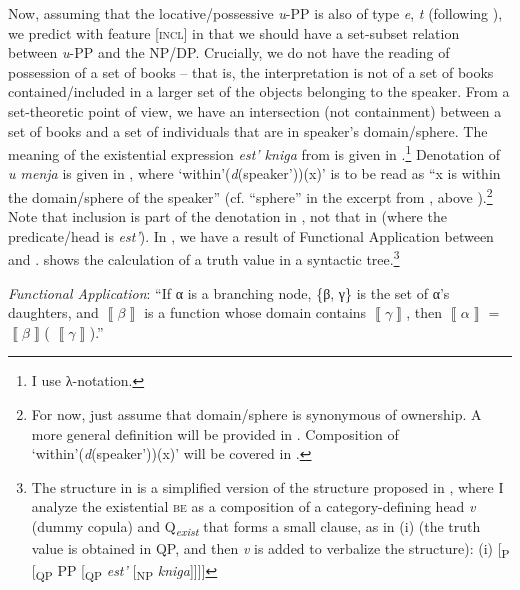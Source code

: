 \documentclass[output=paper,colorlinks,citecolor=brown,modfonts,nonflat]{langsci/langscibook}
\begin{document}
Now, assuming that the locative/possessive \textit{u}{}-PP is also of type {\textlangle}\textit{e}, \textit{t}{\textrangle} (following \citealt[65]{HeimKratzer1998}), we predict with feature [\textsc{incl}] in  that we should have a set-subset relation between \textit{u}{}-PP and the NP/DP. Crucially, we do not have the reading of possession of a set of books – that is, the interpretation is not of a set of books contained/included in a larger set of the objects belonging to the speaker. From a set-theoretic point of view, we have an intersection (not containment) between a set of books and a set of individuals that are in speaker’s domain/sphere. The meaning of the existential expression \textit{est’ kniga} from  is given in .\footnote{I use  λ-notation.} Denotation of \textit{u menja} is given in , where ‘within'(\textit{d}(speaker'))(x)’ is to be read as “x is within the domain/sphere of the speaker” (cf. “sphere” in the excerpt from \citeauthor{BjorkmanCowper2016}, above ).\footnote{For now, just assume that domain/sphere is synonymous of ownership. A more general definition will be provided in . Composition of ‘within\textrm{'}(\textit{d}(speaker\textrm{'}))(x)’ will be covered in .}  Note that inclusion is part of the denotation in , not that in  (where the predicate/head is \textit{est’}). In , we have a result of Functional Application between  and .  shows the calculation of a truth value in a syntactic tree.\footnote{The structure in  is a simplified version of the structure proposed in \citet{TsedrykInPress}, where I analyze the existential \textsc{be} as a composition of a category-defining head \textit{v} (dummy copula) and Q\textit{\textsubscript{exist}} that forms a small clause, as in (i) (the truth value is obtained in QP, and then \textit{v} is added to verbalize the structure):   (i)  [\textsubscript{{\liv}P} {\liv}[\textsubscript{QP} PP [\textsubscript{QP} \textit{est’} [\textsubscript{NP} \textit{kniga}]]]]}

\ea%
    \label{ex:tsedryk:10}
    \textit{Functional Application}: “If α is a branching node, \{β, γ\} is the set of α’s daughters, and  $\left\llbracket \beta \right\rrbracket $  is a function whose domain contains  $\left\llbracket \gamma \right\rrbracket $, then  $\left\llbracket \alpha \right\rrbracket $ =  $\left\llbracket \beta \right\rrbracket $( $\left\llbracket \gamma \right\rrbracket $).” \hfill \citep[44]{HeimKratzer1998}
    \z
\end{document}
